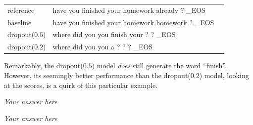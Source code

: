 \documentclass[answers]{exam}
\begin{document}
\begin{CJK}{UTF8}{min}
\begin{questions}
\begin{framed}
  \begin{tabular}{lll}
    reference      & have you finished your homework already ? \_EOS  \\
    baseline       & have you finished your homework homework ? \_EOS \\
    dropout($0.5$) & where did you you finish your ? ? \_EOS \\
    dropout($0.2$) & where did you you a ? ? ? \_EOS  
  \end{tabular}

  Remarkably, the dropout($0.5$) model \emph{does} still generate the word
  ``finish''. However, its seemingly better performance than the dropout($0.2$)
  model, looking at the scores, is a quirk of this particular example. 
\end{framed}



\begin{framed}
\emph{Your answer here}
\end{framed}

\begin{framed}
\emph{Your answer here}
\end{framed}
\end{questions}

\noindent \hrulefill

\clearpage





\end{CJK}
\end{document}
